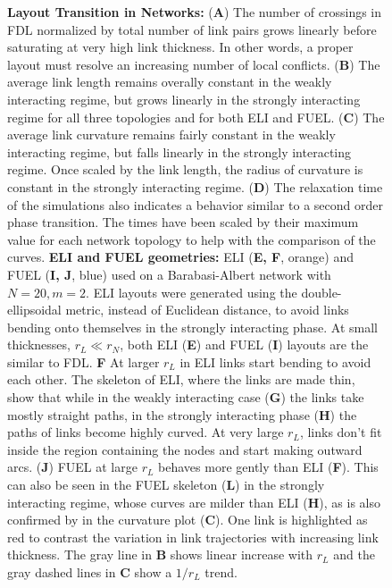 \documentclass[nofootinbib,preprint,floatfix,titlepage,superscriptaddress]{revtex4} %
\begin{document}
\begin{figure}
\caption{%
    \scriptsize {\bf Layout Transition in Networks:} %
    ({\bf A}) The number of crossings in FDL normalized by total number of link pairs grows linearly before saturating at very high link thickness. 
    In other words, a proper layout must resolve an increasing number of local conflicts.    ({\bf B}) The average link length remains overally constant in the weakly interacting regime, but grows linearly in the strongly interacting regime for all three topologies and for both ELI and FUEL.  
    ({\bf C}) The average link curvature remains fairly constant in the weakly interacting regime, but falls linearly in the strongly interacting regime. 
    Once scaled by the link length, the radius of curvature is constant in the strongly interacting regime. 
    ({\bf D}) The relaxation time of the simulations also indicates a behavior similar to a second order phase transition. 
    The times have been scaled by their maximum value for each network topology to help with the comparison of the curves.
    {\bf ELI and FUEL geometries:} 
    ELI ({\bf E, F}, orange) and FUEL ({\bf I, J}, blue) used on a Barabasi-Albert network with $N=20, m=2$. 
    ELI layouts were generated using the double-ellipsoidal metric, instead of Euclidean distance, to avoid links bending onto themselves in the strongly interacting phase. 
    At small thicknesses, $r_L \ll r_N$, both ELI ({\bf E}) and FUEL ({\bf I}) layouts are the similar to FDL. 
    {\bf F} At larger $r_L$ in ELI links start bending to avoid each other. 
    The skeleton of ELI, where the links are made thin, show that while in the weakly interacting case ({\bf G}) the links take mostly straight paths, in the strongly interacting phase ({\bf H}) the paths of links become highly curved.
    At very large $r_L$, links don't fit inside the region containing the nodes and start making outward arcs. 
    ({\bf J}) FUEL at large $r_L$ behaves more gently than ELI ({\bf F}). 
    This can also be seen in the FUEL skeleton ({\bf L}) in the strongly interacting regime, whose curves are milder than ELI ({\bf H}), as is also confirmed by in the curvature plot ({\bf C}). 
    One link is highlighted as red to contrast the variation in link trajectories with increasing link thickness.
    The gray line in {\bf B} shows linear increase with $r_L$ and the gray dashed lines in {\bf C} show a $1/r_L$ trend. 
          }    
    \label{fig:phase-compare}
\end{figure}
\end{document}
